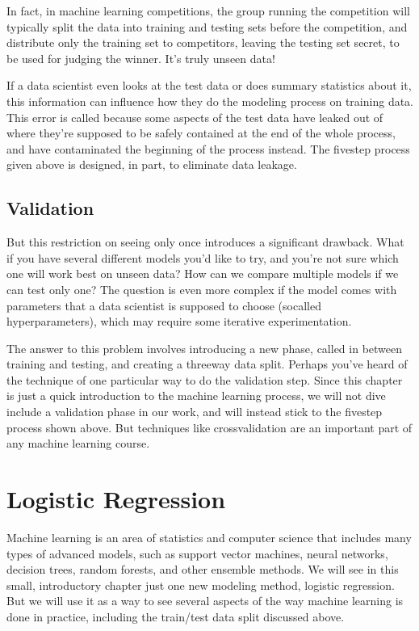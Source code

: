 \documentclass[letterpaper,10pt,english]{jupyterBook}
\begin{document}
\sphinxAtStartPar
In fact, in machine learning competitions, the group running the competition will typically split the data into training and testing sets before the competition, and distribute only the training set to competitors, leaving the testing set secret, to be used for judging the winner.  It’s truly unseen data!

\sphinxAtStartPar
If a data scientist even looks at the test data or does summary statistics about it, this information can influence how they do the modeling process on training data.  This error is called  because some aspects of the test data have leaked out of where they’re supposed to be safely contained at the end of the whole process, and have contaminated the beginning of the process instead.  The five\sphinxhyphen{}step process given above is designed, in part, to eliminate data leakage.


\subsection{Validation}
\label{\detokenize{chapter-17-machine-learning:validation}}
\sphinxAtStartPar
But this restriction on seeing  only once introduces a significant drawback.  What if you have several different models you’d like to try, and you’re not sure which one will work best on unseen data?  How can we compare multiple models if we can test only one?  The question is even more complex if the model comes with parameters that a data scientist is supposed to choose (so\sphinxhyphen{}called hyperparameters), which may require some iterative experimentation.

\sphinxAtStartPar
The answer to this problem involves introducing a new phase, called  in between training and testing, and creating a three\sphinxhyphen{}way data split.  Perhaps you’ve heard of the technique of  one particular way to do the validation step.  Since this chapter is just a quick introduction to the machine learning process, we will not dive include a validation phase in our work, and will instead stick to the five\sphinxhyphen{}step process shown above.  But techniques like cross\sphinxhyphen{}validation are an important part of any machine learning course.


\section{Logistic Regression}
\label{\detokenize{chapter-17-machine-learning:logistic-regression}}
\sphinxAtStartPar
Machine learning is an area of statistics and computer science that includes many types of advanced models, such as support vector machines, neural networks, decision trees, random forests, and other ensemble methods.  We will see in this small, introductory chapter just one new modeling method, logistic regression.  But we will use it as a way to see several aspects of the way machine learning is done in practice, including the train/test data split discussed above.
\end{document}

